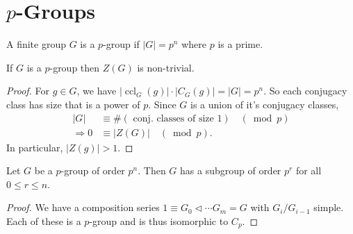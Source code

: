 \documentclass[a4paper]{amsart}
\begin{document}
\section{$p$-Groups}

\begin{definition}
	A finite group $G$ is a $p$-group if $|G| = p^n$ where $p$ is a prime.
\end{definition}

\begin{theorem}
	If $G$ is a $p$-group then $Z(G)$ is non-trivial.
\end{theorem}
\begin{proof}
For $g \in G$, we have $\left|\operatorname{ccl}_{G}(g)\right| \cdot\left|C_{G}(g)\right|=|G|=p^{n}$. So each conjugacy class has size that is a power of $p$. Since $G$ is a union of it's conjugacy classes,
$$
\begin{aligned}
|G| & \equiv \#(\text { conj. classes of size } 1) \quad(\bmod p) \\
\Longrightarrow 0 & \equiv|Z(G)| \quad(\bmod p) .
\end{aligned}
$$
In particular, $|Z(g)|>1$.
\end{proof}

\begin{theorem}
	Let $G$ be a $p$-group of order $p^n$. Then $G$ has a subgroup of order $p^r$ for all $0 \leq r \leq n$.
\end{theorem}
\begin{proof}
	We have a composition series $1 \equiv G_0 \triangleleft \cdots G_m = G$ with $G_{i}/G_{i-1}$ simple. Each of these is a $p$-group and is thus isomorphic to $C_p$.
\end{proof}

\end{document}
